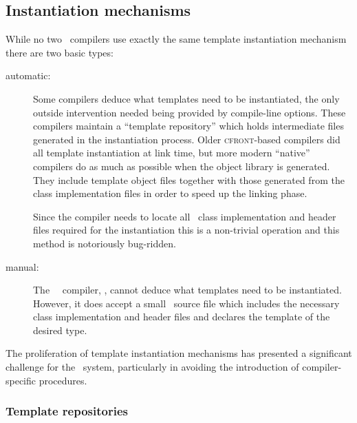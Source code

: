 \subsection*{Instantiation mechanisms}



While no two \cplusplus\ compilers use exactly the same template instantiation
mechanism there are two basic types:

\begin{description}
\item[automatic:]
   Some compilers deduce what templates need to be instantiated, the only
   outside intervention needed being provided by compile-line options.  These
   compilers maintain a ``template repository'' which holds intermediate files
   generated in the instantiation process.  Older \textsc{cfront}-based
   compilers did all template instantiation at link time, but more modern
   ``native'' compilers do as much as possible when the object library is
   generated.  They include template object files together with those
   generated from the class implementation files in order to speed up the
   linking phase.

   Since the compiler needs to locate all \cplusplus\ class implementation and
   header files required for the instantiation this is a non-trivial operation
   and this method is notoriously bug-ridden.

\item[manual:]
   The \gnu\ \cplusplus\ compiler, , cannot deduce what templates
   need to be instantiated.  However, it does accept a small \cplusplus\ source
   file which includes the necessary class implementation and header files and
   declares the template of the desired type.
\end{description}

The proliferation of template instantiation mechanisms has presented a
significant challenge for the \aipspp\ system, particularly in avoiding the
introduction of compiler-specific procedures.

\subsubsection*{Template repositories}


